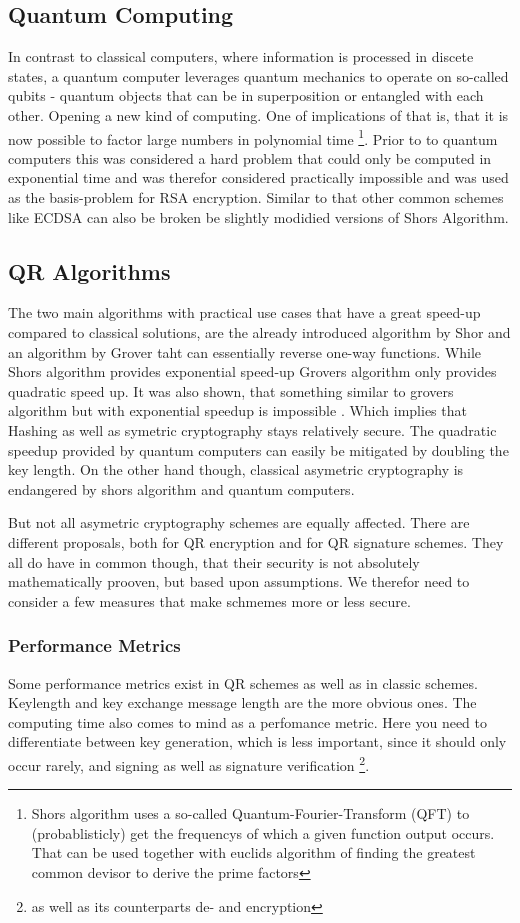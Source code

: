 \documentclass[conference]{IEEEtran}
\begin{document}
\subsection{Quantum Computing}\label{quantum_computing}
In contrast to classical computers, where information is processed in discete states, a quantum computer leverages quantum mechanics to operate on so-called qubits - quantum objects that can be in superposition or entangled with each other. 
Opening a new kind of computing. 
One of implications of that is, that it is now possible to factor large numbers in polynomial time \cite{Shor} \footnote{Shors algorithm uses a so-called Quantum-Fourier-Transform (QFT) to (probablisticly) get the frequencys of which a given function output occurs. That can be used together with euclids algorithm of finding the greatest common devisor to derive the prime factors}. 
Prior to to quantum computers this was considered a hard problem that could only be computed in exponential time and was therefor considered practically impossible and was used as the basis-problem for RSA encryption.
Similar to that other common schemes like ECDSA can also be broken be slightly modidied versions of Shors Algorithm.
\subsection{QR Algorithms}
The two main algorithms with practical use cases that have a great speed-up compared to classical solutions, are the already introduced algorithm by Shor and an algorithm by Grover taht can essentially reverse one-way functions.
While Shors algorithm provides exponential speed-up Grovers algorithm only provides quadratic speed up. It was also shown, that something similar to grovers algorithm but with exponential speedup is impossible \cite{Strengths&Weaknesses_QC}. Which implies that Hashing as well as symetric cryptography stays relatively secure.
The quadratic speedup provided by quantum computers can easily be mitigated by doubling the key length.
On the other hand though, classical asymetric cryptography is endangered by shors algorithm and quantum computers.

But not all asymetric cryptography schemes are equally affected.
There are different proposals, both for QR encryption and for QR signature schemes.
They all do have in common though, that their security is not absolutely mathematically prooven, but based upon assumptions.
We therefor need to consider a few measures that make schmemes more or less secure.
\subsubsection{Performance Metrics}
Some performance metrics exist in QR schemes as well as in classic schemes.
Keylength and
key exchange message length \cite{QR_algs} are the more obvious ones.
The computing time also comes to mind as a perfomance metric. Here you need to differentiate between key generation, which is less important, since it should only occur rarely, and signing as well as signature verification \footnote{as well as its counterparts de- and encryption}.
\end{document}
